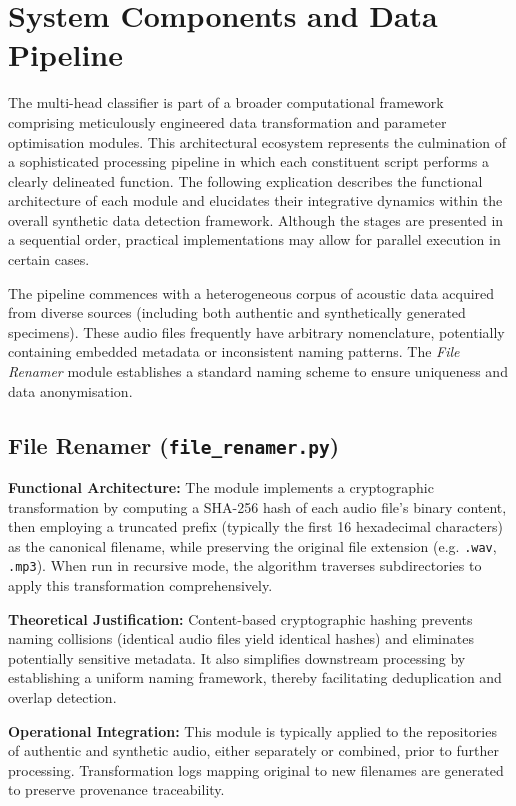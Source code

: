 \documentclass[conference]{IEEEtran}  %
\begin{document}
\section{System Components and Data Pipeline}
The multi-head classifier is part of a broader computational framework comprising meticulously engineered data transformation and parameter optimisation modules. This architectural ecosystem represents the culmination of a sophisticated processing pipeline in which each constituent script performs a clearly delineated function. The following explication describes the functional architecture of each module and elucidates their integrative dynamics within the overall synthetic data detection framework. Although the stages are presented in a sequential order, practical implementations may allow for parallel execution in certain cases.

The pipeline commences with a heterogeneous corpus of acoustic data acquired from diverse sources (including both authentic and synthetically generated specimens). These audio files frequently have arbitrary nomenclature, potentially containing embedded metadata or inconsistent naming patterns. The \emph{File Renamer} module establishes a standard naming scheme to ensure uniqueness and data anonymisation.

\subsection{File Renamer (\texttt{file\_renamer.py})}
\textbf{Functional Architecture:} The module implements a cryptographic transformation by computing a SHA-256 hash of each audio file's binary content, then employing a truncated prefix (typically the first 16 hexadecimal characters) as the canonical filename, while preserving the original file extension (e.g. \texttt{.wav}, \texttt{.mp3}). When run in recursive mode, the algorithm traverses subdirectories to apply this transformation comprehensively.

\textbf{Theoretical Justification:} Content-based cryptographic hashing prevents naming collisions (identical audio files yield identical hashes) and eliminates potentially sensitive metadata. It also simplifies downstream processing by establishing a uniform naming framework, thereby facilitating deduplication and overlap detection.

\textbf{Operational Integration:} This module is typically applied to the repositories of authentic and synthetic audio, either separately or combined, prior to further processing. Transformation logs mapping original to new filenames are generated to preserve provenance traceability.
\end{document}
